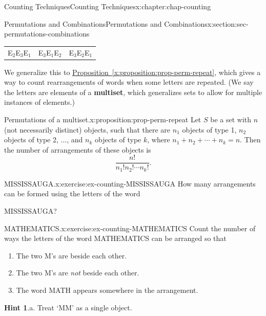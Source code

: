 \documentclass[oneside,10pt,]{book}
\newcommand{\blocktitlefont}{\relax}
\newcommand{\xreffont}{\relax}
\newcommand{\terminology}[1]{\textbf{#1}}
\numberwithin{equation}{section}
\begin{document}
\begin{chapterptx}{Counting Techniques}{}{Counting Techniques}{}{}{x:chapter:chap-counting}
\begin{sectionptx}{Permutations and Combinations}{}{Permutations and Combinations}{}{}{x:section:sec-permutations-combinations}
\begin{sidebyside}{1}{0.1}{0.1}{0}
\begin{sbspanel}{0.8}
{{\begin{tabular}{lll}
E\(_2\)E\(_3\)E\(_1\)&E\(_3\)E\(_1\)E\(_2\)&E\(_3\)E\(_2\)E\(_1\)
\end{tabular}
}%
\par}
\end{sbspanel}%
\end{sidebyside}%
\par
We generalize this to \hyperref[x:proposition:prop-perm-repeat]{Proposition~{\xreffont\ref{x:proposition:prop-perm-repeat}}}, which gives a way to count rearrangements of words when some letters are repeated. (We say the letters are elements of a \terminology{multiset}, which generalizes sets to allow for multiple instances of elements.)%
\begin{proposition}{Permutations of a multiset.}{}{x:proposition:prop-perm-repeat}%
Let \(S\) be a set with \(n\) (not necessarily distinct) objects, such that there are \(n_1\) objects of type 1, \(n_2\) objects of type 2, \(\ldots\), and \(n_k\) objects of type \(k\), where \(n_1 + n_2 + \cdots + n_k = n\). Then the number of arrangements of these objects is%
\begin{equation*}
\dfrac{n!}{n_1! n_2! \cdots n_k!}\text{.}
\end{equation*}
%
\end{proposition}
\begin{inlineexercise}{MISSISSAUGA.}{x:exercise:ex-counting-MISSISSAUGA}%
How many arrangements can be formed using the letters of the word%
\begin{sidebyside}{1}{0.375}{0.375}{0}%
\begin{sbspanel}{0.25}%
MISSISSAUGA?%
\end{sbspanel}%
\end{sidebyside}%
\end{inlineexercise}
\begin{inlineexercise}{MATHEMATICS.}{x:exercise:ex-counting-MATHEMATICS}%
Count the number of ways the letters of the word MATHEMATICS can be arranged so that%
\begin{enumerate}[label=(\alph*)]
\item{}The two M's are beside each other.%
\item{}The two M's are \emph{not} beside each other.%
\item{}The word MATH appears somewhere in the arrangement.%
\end{enumerate}
%
\par\smallskip%
\noindent\textbf{\blocktitlefont Hint 1}.\hypertarget{g:hint:id424439}{}\quad{}a. Treat `MM' as a single object.%
\par\smallskip%

\end{inlineexercise}
\end{sectionptx}
\end{chapterptx}
\end{document}
